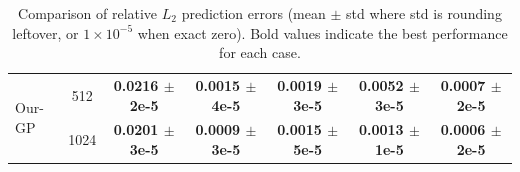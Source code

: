\documentclass{article}
\begin{document}
\begin{table}[!htbp]
{\begin{tabular}{@{}lcccccc@{}}
\hline
\multirow{2}{*}{Our-GP} & 512 & \textbf{0.0216 $\pm$2e-5} & \textbf{0.0015 $\pm$4e-5} & \textbf{0.0019 $\pm$3e-5} & \textbf{0.0052 $\pm$3e-5} & \textbf{0.0007 $\pm$2e-5} \\
& 1024 & \textbf{0.0201 $\pm$3e-5} & \textbf{0.0009 $\pm$3e-5} & \textbf{0.0015 $\pm$5e-5} & \textbf{0.0013 $\pm$1e-5} & \textbf{0.0006 $\pm$2e-5} \\
\hline
\end{tabular}}
\vspace{1em}
\caption{\small Comparison of relative $L_2$ prediction errors (mean $\pm$ std where std is rounding leftover, or $1\times10^{-5}$ when exact zero). Bold values indicate the best performance for each case.}
\label{tab:nrmse}
\end{table}


\newpage




\end{document}
